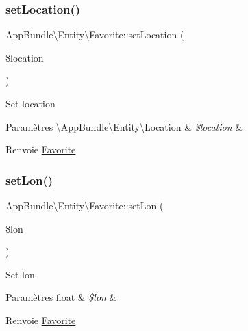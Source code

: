 \subsubsection{\texorpdfstring{set\+Location()}{setLocation()}}
{\footnotesize\ttfamily App\+Bundle\textbackslash{}\+Entity\textbackslash{}\+Favorite\+::set\+Location (\begin{DoxyParamCaption}\item[{\textbackslash{}\hyperlink{classAppBundle_1_1Entity_1_1Location}{App\+Bundle\textbackslash{}\+Entity\textbackslash{}\+Location}}]{\$location }\end{DoxyParamCaption})}

Set location


\begin{DoxyParams}[1]{Paramètres}
\textbackslash{}\+App\+Bundle\textbackslash{}\+Entity\textbackslash{}\+Location & {\em \$location} & \\
\hline
\end{DoxyParams}
\begin{DoxyReturn}{Renvoie}
\hyperlink{classAppBundle_1_1Entity_1_1Favorite}{Favorite} 
\end{DoxyReturn}
\mbox{\label{classAppBundle_1_1Entity_1_1Favorite_a8dcb451f06346ea01b131bfc174821dd}} 
\subsubsection{\texorpdfstring{set\+Lon()}{setLon()}}
{\footnotesize\ttfamily App\+Bundle\textbackslash{}\+Entity\textbackslash{}\+Favorite\+::set\+Lon (\begin{DoxyParamCaption}\item[{}]{\$lon }\end{DoxyParamCaption})}

Set lon


\begin{DoxyParams}[1]{Paramètres}
float & {\em \$lon} & \\
\hline
\end{DoxyParams}
\begin{DoxyReturn}{Renvoie}
\hyperlink{classAppBundle_1_1Entity_1_1Favorite}{Favorite} 
\end{DoxyReturn}
\mbox{\label{classAppBundle_1_1Entity_1_1Favorite_a2c0e6fb12140e51b95c906ac86b952b9}} 
